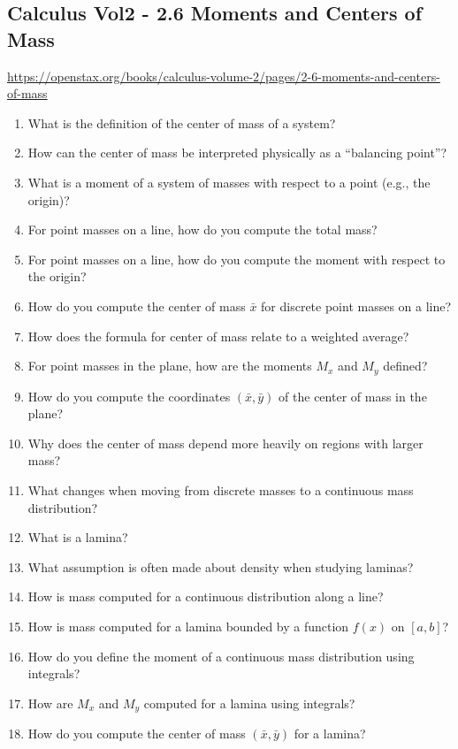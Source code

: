 \subsection{Calculus Vol2 - 2.6 Moments and Centers of Mass}

\url{https://openstax.org/books/calculus-volume-2/pages/2-6-moments-and-centers-of-mass}

\begin{enumerate}
  \item What is the definition of the center of mass of a system?
  \item How can the center of mass be interpreted physically as a “balancing point”?
  \item What is a moment of a system of masses with respect to a point (e.g., the origin)?
  \item For point masses on a line, how do you compute the total mass?
  \item For point masses on a line, how do you compute the moment with respect to the origin?
  \item How do you compute the center of mass $\bar{x}$ for discrete point masses on a line?
  \item How does the formula for center of mass relate to a weighted average?
  \item For point masses in the plane, how are the moments $M_x$ and $M_y$ defined?
  \item How do you compute the coordinates $(\bar{x}, \bar{y})$ of the center of mass in the plane?
  \item Why does the center of mass depend more heavily on regions with larger mass?
  \item What changes when moving from discrete masses to a continuous mass distribution?
  \item What is a lamina?
  \item What assumption is often made about density when studying laminas?
  \item How is mass computed for a continuous distribution along a line?
  \item How is mass computed for a lamina bounded by a function $f(x)$ on $[a,b]$?
  \item How do you define the moment of a continuous mass distribution using integrals?
  \item How are $M_x$ and $M_y$ computed for a lamina using integrals?
  \item How do you compute the center of mass $(\bar{x}, \bar{y})$ for a lamina?

\end{enumerate}
